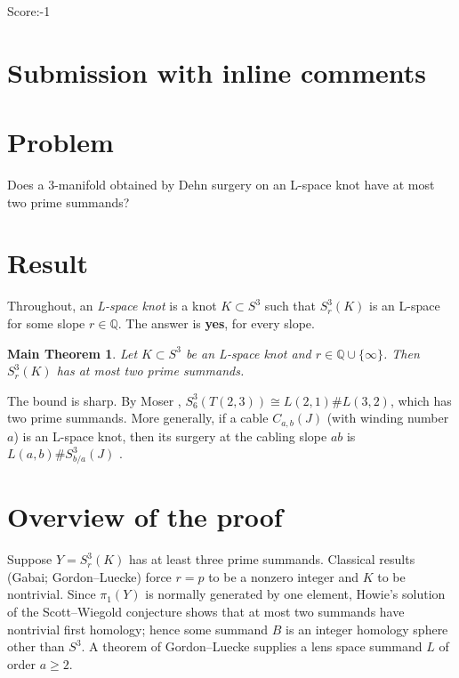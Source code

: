 \documentclass[11pt]{article}
\newtheorem*{maintheorem}{Main Theorem}
\theoremstyle{definition}
\newcommand{\Q}{\mathbb{Q}}
\begin{document}
\noindent Score:-1
\newpage
\section{Submission with inline comments}


\section*{Problem}

Does a $3$-manifold obtained by Dehn surgery on an L-space knot have at most two prime summands?

\section*{Result}

Throughout, an \emph{L-space knot} is a knot $K\subset S^3$ such that $S^3_r(K)$ is an L-space for some slope $r\in\Q$. The answer is \textbf{yes}, for every slope.

\begin{maintheorem}
Let $K\subset S^3$ be an L-space knot and $r\in\Q\cup\{\infty\}$. Then $S^3_r(K)$ has at most two prime summands.
\end{maintheorem}

The bound is sharp. By Moser \cite{Moser}, $S^3_6(T(2,3))\cong L(2,1)\# L(3,2)$, which has two prime summands. More generally, if a cable $C_{a,b}(J)$ (with winding number $a$) is an L-space knot, then its surgery at the cabling slope $ab$ is $L(a,b)\# S^3_{b/a}(J)$ \cite{Gordon83}.

\section*{Overview of the proof}

Suppose $Y=S^3_r(K)$ has at least three prime summands. Classical results (Gabai; Gordon--Luecke) force $r=p$ to be a nonzero integer and $K$ to be nontrivial. Since $\pi_1(Y)$ is normally generated by one element, Howie's solution of the Scott--Wiegold conjecture shows that at most two summands have nontrivial first homology; hence some summand $B$ is an integer homology sphere other than $S^3$. A theorem of Gordon--Luecke supplies a lens space summand $L$ of order $a\ge 2$.
\end{document}
